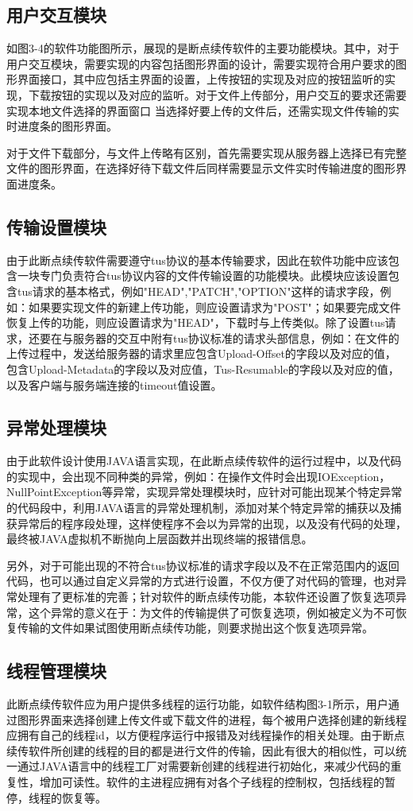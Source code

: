 \documentclass[bachelor]{thesis-uestc}
\begin{document}
\subsection{用户交互模块}
如图3-4的软件功能图所示，展现的是断点续传软件的主要功能模块。其中，对于用户交互模块，需要实现的内容包括图形界面的设计，需要实现符合用户要求的图形界面接口，其中应包括主界面的设置，上传按钮的实现及对应的按钮监听的实现，下载按钮的实现以及对应的监听。对于文件上传部分，用户交互的要求还需要实现本地文件选择的界面窗口
当选择好要上传的文件后，还需实现文件传输的实时进度条的图形界面。
\par 对于文件下载部分，与文件上传略有区别，首先需要实现从服务器上选择已有完整文件的图形界面，在选择好待下载文件后同样需要显示文件实时传输进度的图形界面进度条。
\subsection{传输设置模块}
由于此断点续传软件需要遵守tus协议的基本传输要求，因此在软件功能中应该包含一块专门负责符合tus协议内容的文件传输设置的功能模块。此模块应该设置包含tus请求的基本格式，例如"HEAD","PATCH","OPTION"这样的请求字段，例如：如果要实现文件的新建上传功能，则应设置请求为"POST"；如果要完成文件恢复上传的功能，则应设置请求为"HEAD"，下载时与上传类似。除了设置tus请求，还要在与服务器的交互中附有tus协议标准的请求头部信息，例如：在文件的上传过程中，发送给服务器的请求里应包含Upload-Offset的字段以及对应的值，包含Upload-Metadata的字段以及对应值，Tus-Resumable的字段以及对应的值，以及客户端与服务端连接的timeout值设置。
\subsection{异常处理模块}
由于此软件设计使用JAVA语言实现，在此断点续传软件的运行过程中，以及代码的实现中，会出现不同种类的异常，例如：在操作文件时会出现IOException，NullPointException等异常，实现异常处理模块时，应针对可能出现某个特定异常的代码段中，利用JAVA语言的异常处理机制，添加对某个特定异常的捕获以及捕获异常后的程序段处理，这样使程序不会以为异常的出现，以及没有代码的处理，最终被JAVA虚拟机不断抛向上层函数并出现终端的报错信息。
\par 另外，对于可能出现的不符合tus协议标准的请求字段以及不在正常范围内的返回代码，也可以通过自定义异常的方式进行设置，不仅方便了对代码的管理，也对异常处理有了更标准的完善；针对软件的断点续传功能，本软件还设置了恢复选项异常，这个异常的意义在于：为文件的传输提供了可恢复选项，例如被定义为不可恢复传输的文件如果试图使用断点续传功能，则要求抛出这个恢复选项异常。
\subsection{线程管理模块}
此断点续传软件应为用户提供多线程的运行功能，如软件结构图3-1所示，用户通过图形界面来选择创建上传文件或下载文件的进程，每个被用户选择创建的新线程应拥有自己的线程id，以方便程序运行中报错及对线程操作的相关处理。由于断点续传软件所创建的线程的目的都是进行文件的传输，因此有很大的相似性，可以统一通过JAVA语言中的线程工厂对需要新创建的线程进行初始化，来减少代码的重复性，增加可读性。软件的主进程应拥有对各个子线程的控制权，包括线程的暂停，线程的恢复等。
\end{document}
